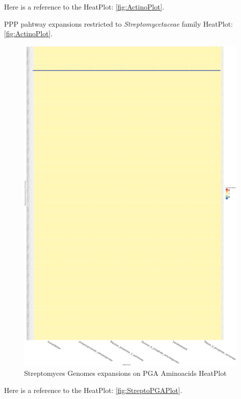 \documentclass[12pt,twoside]{reedthesis}
\begin{document}
  Here is a reference to the HeatPlot: \autoref{fig:ActinoPlot}.
  \clearpage 
  
  PPP pahtway expansions restricted to \emph{Streptomycetaceae} family
  HeatPlot: \autoref{fig:ActinoPlot}.
  
  \begin{figure}[h!tbp]
  \centering
  \includegraphics[angle = 0,scale = 0.7]{chapter4/HeatPlotStreptoPGA.pdf}
  \caption[Streptomyces Genomes expansions on PGA Aminoacids HeatPlot]{\normalsize{Streptomyces Genomes expansions on PGA Aminoacids HeatPlot}}
  \label{fig:StreptoPGAPlot}
  \end{figure}
  
  Here is a reference to the HeatPlot: \autoref{fig:StreptoPGAPlot}.
  \clearpage 
  
\end{document}
